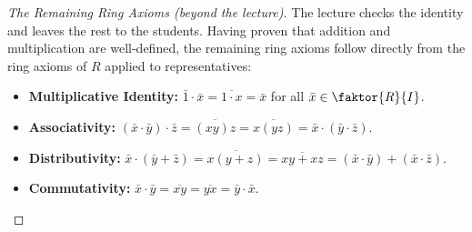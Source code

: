 \begin{content}

\begin{proof}[The Remaining Ring Axioms (beyond the lecture)]
The lecture checks the identity and leaves the rest to the students. Having proven that addition and multiplication are well-defined, the remaining ring axioms follow directly from the ring axioms of $R$ applied to representatives:
\begin{itemize}
    \item \textbf{Multiplicative Identity:} $\bar{1} \cdot \bar{x} = \overline{1 \cdot x} = \bar{x}$ for all $\bar{x} \in \faktor{R}{I}$.
    \item \textbf{Associativity:} $(\bar{x} \cdot \bar{y}) \cdot \bar{z} = \overline{(x y) z} = \overline{x (y z)} = \bar{x} \cdot (\bar{y} \cdot \bar{z})$.
    \item \textbf{Distributivity:} $\bar{x} \cdot (\bar{y} + \bar{z}) = \overline{x (y + z)} = \overline{x y + x z} = (\bar{x} \cdot \bar{y}) + (\bar{x} \cdot \bar{z})$.
    \item \textbf{Commutativity:} $\bar{x} \cdot \bar{y} = \overline{x y} = \overline{y x} = \bar{y} \cdot \bar{x}$.
\end{itemize}
\end{proof}
\end{content}

\begin{hidden}
\end{hidden}

